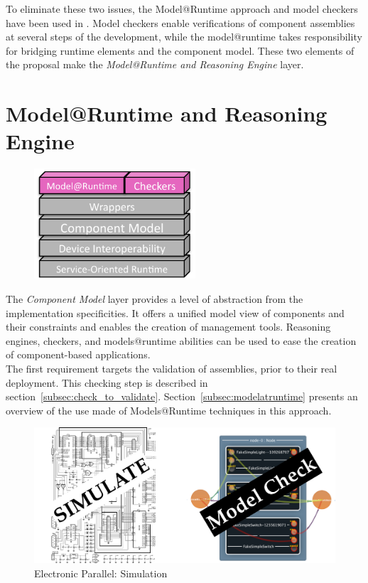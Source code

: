 To eliminate these two issues, the Model@Runtime approach and model checkers have been used in \enti{}. Model checkers enable verifications of component assemblies at several steps of the development, while the model@runtime takes responsibility for bridging runtime elements and the component model. These two elements of the proposal make the {\it Model@Runtime and Reasoning Engine} layer.\\


\section{Model@Runtime and Reasoning Engine}
\label{sec:martAndReasoning}

\begin{figure}
  \vspace{-5mm}
  \includegraphics[width=60mm]{part2/pics/layers/MartReasoners.pdf}
  \vspace{-5mm}
\end{figure}

The {\it Component Model} layer provides a level of abstraction from the implementation specificities. It offers a unified model view of components and their constraints and enables the creation of management tools. Reasoning engines, checkers, and models@runtime abilities can be used to ease the creation of component-based applications.\\
The first requirement targets the validation of assemblies, prior to their real deployment. This checking step is described in section~\ref{subsec:check_to_validate}. Section~\ref{subsec:modelatruntime} presents an overview of the use made of Models@Runtime techniques in this approach.

\begin{figure}[h!]
	\includegraphics[width=\textwidth]{part2/pics/ModelCheck.pdf}
	\caption{Electronic Parallel: Simulation}
  	\label{fig:elecSimulation}
\end{figure}

